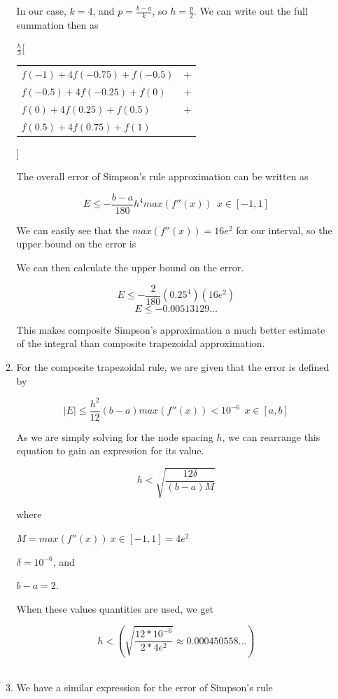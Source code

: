 \documentclass[11pt]{article}
\begin{document}
\begin{enumerate}
\begin{enumerate}
		In our case, $k = 4$, and $p = \frac{b-a}{k}$, so $h = \frac{p}{2}$. We can write out the full summation then as

		\medskip

		$\frac{h}{3}$[
		\begin{tabular}{ll}
			$f(-1) + 4f(-0.75) + f(-0.5)$ & $+$ \\
			$f(-0.5) + 4f(-0.25) + f(0)$ & $+$ \\
			$f(0) + 4f(0.25) + f(0.5)$ & $+$ \\
			$f(0.5) + 4f(0.75) + f(1)$
		\end{tabular}
		]

		\medskip

		The overall error of Simpson's rule approximation can be written as

		\[
		E \leq -\frac{b-a}{180}h^4max(f''(x))\ \ x\in[-1,1]
		\]

		We can easily see that the $max(f''(x)) = 16e^2$ for our interval, so the upper bound on the error is

		We can then calculate the upper bound on the error.

		\[
		E \leq -\frac{2}{180}(0.25^4)(16e^2)
		\]
		\[
		E \leq -0.00513129\ldots
		\]

		This makes composite Simpson's approximation a much better estimate of the integral than composite trapezoidal approximation.

		\medskip

		\item For the composite trapezoidal rule, we are given that the error is defined by

		\[
		|E| \leq \frac{h^2}{12} (b-a) max(f''(x)) < 10^{-6}\ \ x\in[a,b]
		\]

		As we are simply solving for the node spacing $h$, we can rearrange this equation to gain an expression for its value.

		\[
		h  < \sqrt{\frac{12\delta}{(b-a)M}}
		\]

		where

		$M=max(f''(x))\ x\in[-1,1] = 4e^2$

		$\delta=10^{-6}$, and

		$b-a=2$.

		When these values quantities are used, we get

		\[
		h < (\sqrt{\frac{12*10^{-6}}{2*4e^2}} \approx 0.000450558\ldots)
		\] \

		\item We have a similar expression for the error of Simpson's rule


\end{enumerate}
\end{enumerate}
\end{document}
